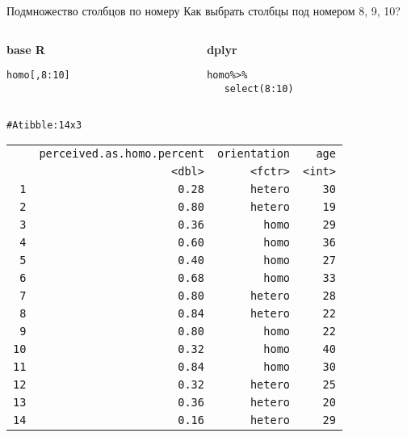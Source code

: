 \begin{frame}{Подмножество столбцов по номеру}
\noindent Как выбрать столбцы под номером 8, 9, 10?\\ \vfill
\begin{columns}[T] 
\begin{column}{.48\textwidth}
\textbf{base R}\\
\scriptsize
\begin{alltt}
homo[, 8:10]
\end{alltt}
\normalsize
\end{column}
\hfill
\begin{column}{.48\textwidth}
\textbf{dplyr}\\
\scriptsize
\begin{alltt}
homo \alert{\%>\%}\\ 
\ \ \ \alert{select(}8:10\alert{)}
\end{alltt}
\normalsize
\end{column}
\end{columns}
\hfill
\scriptsize
\begin{alltt}
\# A tibble: 14 x 3\\
\begin{tabular}{rrrr}
 & perceived.as.homo.percent & orientation & age \\ 
 & <dbl> & <fctr> & <int> \\ 
1 & 0.28 & hetero & 30 \\ 
2 & 0.80 & hetero & 19 \\ 
3 & 0.36 & homo & 29 \\ 
4 & 0.60 & homo & 36 \\ 
5 & 0.40 & homo & 27 \\ 
6 & 0.68 & homo & 33 \\ 
7 & 0.80 & hetero & 28 \\ 
8 & 0.84 & hetero & 22 \\ 
9 & 0.80 & homo & 22 \\ 
10 & 0.32 & homo & 40 \\ 
11 & 0.84 & homo & 30 \\ 
12 & 0.32 & hetero & 25 \\ 
13 & 0.36 & hetero & 20 \\ 
14 & 0.16 & hetero & 29 \\ 
\end{tabular}
\\
\end{alltt}
\normalsize
\hfill\\
\end{frame}

